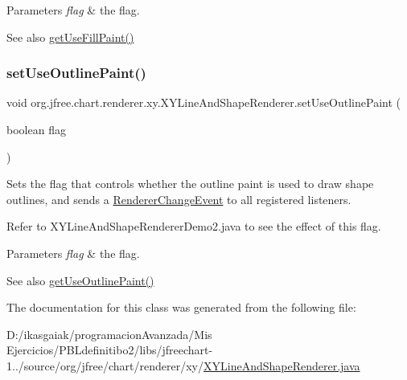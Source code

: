 \begin{DoxyParams}{Parameters}
{\em flag} & the flag.\\
\hline
\end{DoxyParams}
\begin{DoxySeeAlso}{See also}
\mbox{\hyperlink{classorg_1_1jfree_1_1chart_1_1renderer_1_1xy_1_1_x_y_line_and_shape_renderer_a8bd7907c3f07dbe4495fd3f0d7a7e4d4}{get\+Use\+Fill\+Paint()}} 
\end{DoxySeeAlso}
\mbox{\label{classorg_1_1jfree_1_1chart_1_1renderer_1_1xy_1_1_x_y_line_and_shape_renderer_a2cea4417beb098e96e8f15c7268d5ad7}} 
\subsubsection{\texorpdfstring{set\+Use\+Outline\+Paint()}{setUseOutlinePaint()}}
{\footnotesize\ttfamily void org.\+jfree.\+chart.\+renderer.\+xy.\+X\+Y\+Line\+And\+Shape\+Renderer.\+set\+Use\+Outline\+Paint (\begin{DoxyParamCaption}\item[{boolean}]{flag }\end{DoxyParamCaption})}

Sets the flag that controls whether the outline paint is used to draw shape outlines, and sends a \mbox{\hyperlink{}{Renderer\+Change\+Event}} to all registered listeners. 

Refer to {\ttfamily X\+Y\+Line\+And\+Shape\+Renderer\+Demo2.\+java} to see the effect of this flag.


\begin{DoxyParams}{Parameters}
{\em flag} & the flag.\\
\hline
\end{DoxyParams}
\begin{DoxySeeAlso}{See also}
\mbox{\hyperlink{classorg_1_1jfree_1_1chart_1_1renderer_1_1xy_1_1_x_y_line_and_shape_renderer_a4c0299cee69c99c4a119ff4e945e0b3d}{get\+Use\+Outline\+Paint()}} 
\end{DoxySeeAlso}


The documentation for this class was generated from the following file\+:\begin{DoxyCompactItemize}
\item 
D\+:/ikasgaiak/programacion\+Avanzada/\+Mis Ejercicios/\+P\+B\+Ldefinitibo2/libs/jfreechart-\/1../source/org/jfree/chart/renderer/xy/\mbox{\hyperlink{_x_y_line_and_shape_renderer_8java}{X\+Y\+Line\+And\+Shape\+Renderer.\+java}}\end{DoxyCompactItemize}
